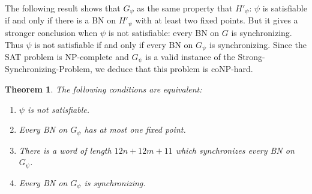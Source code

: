 \documentclass[11pt,letter]{article}
\newtheorem{theorem}{Theorem}
\begin{document}
\medskip
The following result shows that $G_\psi$ as the same property that $H'_\psi$: $\psi$ is satisfiable if and only if there is a BN on $H'_\psi$ with at least two fixed points. But it gives a stronger conclusion when $\psi$ is not satisfiable: every BN on $G$ is synchronizing. Thus $\psi$ is not satisfiable if and only if every BN on $G_\psi$ is synchronizing. Since the SAT problem is NP-complete and $G_\psi$ is a valid instance of the {\sc Strong-Synchronizing-Problem}, we deduce that this problem is coNP-hard.   

\begin{theorem}\label{thm:fixed_point}
The following conditions are equivalent:
\begin{enumerate}
\item $\psi$ is not satisfiable. 
\item Every BN on $G_\psi$ has at most one fixed point.
\item There is a word of length $12n+12m+11$ which synchronizes every BN on~$G_\psi$.
\item Every BN on $G_\psi$ is synchronizing.
\end{enumerate}
\end{theorem}
\end{document}
